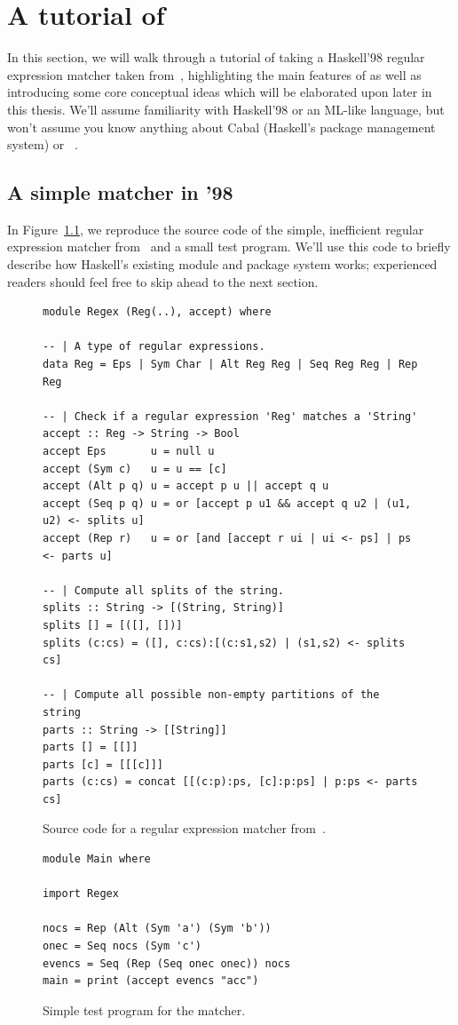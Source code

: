 \chapter{A tutorial of \Backpack{}}
\label{sec:tour}

In this section, we will walk through a tutorial of taking a Haskell'98
regular expression matcher taken
from~\cite{Fischer:2010:PRE:1863543.1863594}, highlighting the main
features of \Backpack{} as well as introducing some core conceptual
ideas which will be elaborated upon later in this thesis.  We'll assume
familiarity with Haskell'98 or an ML-like language, but won't assume you
know anything about Cabal (Haskell's package management system) or
\OldBackpack{}~\cite{backpack}.

\section{A simple matcher in '98}

In Figure~\ref{fig:matcher-haskell98}, we reproduce the source code of
the simple, inefficient regular expression matcher
from~\cite{Fischer:2010:PRE:1863543.1863594} and a small test program.
We'll use this code to briefly describe how Haskell's existing module
and package system works; experienced readers should feel free to skip
ahead to the next section.

\begin{figure}
\begin{lstlisting}
module Regex (Reg(..), accept) where

-- | A type of regular expressions.
data Reg = Eps | Sym Char | Alt Reg Reg | Seq Reg Reg | Rep Reg

-- | Check if a regular expression 'Reg' matches a 'String'
accept :: Reg -> String -> Bool
accept Eps       u = null u
accept (Sym c)   u = u == [c]
accept (Alt p q) u = accept p u || accept q u
accept (Seq p q) u = or [accept p u1 && accept q u2 | (u1, u2) <- splits u]
accept (Rep r)   u = or [and [accept r ui | ui <- ps] | ps <- parts u]

-- | Compute all splits of the string.
splits :: String -> [(String, String)]
splits [] = [([], [])]
splits (c:cs) = ([], c:cs):[(c:s1,s2) | (s1,s2) <- splits cs]

-- | Compute all possible non-empty partitions of the string
parts :: String -> [[String]]
parts [] = [[]]
parts [c] = [[[c]]]
parts (c:cs) = concat [[(c:p):ps, [c]:p:ps] | p:ps <- parts cs]
\end{lstlisting}
\caption{Source code for a regular expression matcher from~\cite{Fischer:2010:PRE:1863543.1863594}.}
\begin{lstlisting}
module Main where

import Regex

nocs = Rep (Alt (Sym 'a') (Sym 'b'))
onec = Seq nocs (Sym 'c')
evencs = Seq (Rep (Seq onec onec)) nocs
main = print (accept evencs "acc")
\end{lstlisting}
\caption{Simple test program for the matcher.}
\label{fig:matcher-haskell98}
\end{figure}

